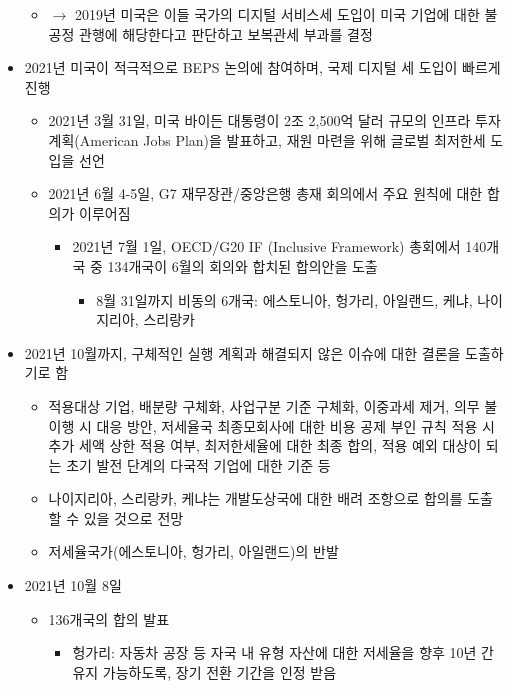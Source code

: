 \begin{itemize}
\begin{itemize}
	\item $\rightarrow$ 2019년 미국은 이들 국가의 디지털 서비스세 도입이 미국 기업에 대한 불공정 관행에 해당한다고 판단하고 보복관세 부과를 결정
	\end{itemize}
\item 2021년 미국이 적극적으로 BEPS 논의에 참여하며, 국제 디지털 세 도입이 빠르게 진행
	\begin{itemize}
	\item 2021년 3월 31일, 미국 바이든 대통령이 2조 2,500억 달러 규모의 인프라 투자 계획(American Jobs Plan)을 발표하고, 재원 마련을 위해 글로벌 최저한세 도입을 선언
	\item 2021년 6월 4-5일,  G7 재무장관/중앙은행 총재 회의에서 주요 원칙에 대한 합의가 이루어짐
		\begin{itemize}
		\item 2021년 7월 1일, OECD/G20 IF (Inclusive Framework) 총회에서 140개국 중 134개국이 6월의 회의와 합치된 합의안을 도출
			\begin{itemize}
			\item 8월 31일까지 비동의 6개국: 에스토니아, 헝가리, 아일랜드, 케냐, 나이지리아, 스리랑카
			\end{itemize}
		\end{itemize}
	\end{itemize}
\item 2021년 10월까지, 구체적인 실행 계획과 해결되지 않은 이슈에 대한 결론을 도출하기로 함
	\begin{itemize}
	\item 적용대상 기업, 배분량 구체화, 사업구분 기준 구체화, 이중과세 제거, 의무 불이행 시 대응 방안, 저세율국 최종모회사에 대한 비용 공제 부인 규칙 적용 시 추가 세액 상한 적용 여부, 최저한세율에 대한 최종 합의, 적용 예외 대상이 되는 초기 발전 단계의 다국적 기업에 대한 기준 등
	\item 나이지리아, 스리랑카, 케냐는 개발도상국에 대한 배려 조항으로 합의를 도출할 수 있을 것으로 전망
	\item 저세율국가(에스토니아, 헝가리, 아일랜드)의 반발
	\end{itemize}	
\item 2021년 10월 8일 \citep{OECD/G20-Base-Erosion-and-Profit-Shifting-Project:2021aa}	
	\begin{itemize}
	\item 136개국의 합의 발표
		\begin{itemize}
		\item 헝가리: 자동차 공장 등 자국 내 유형 자산에 대한 저세율을 향후 10년 간 유지 가능하도록, 장기 전환 기간을 인정 받음

\end{itemize}
\end{itemize}
\end{itemize}
